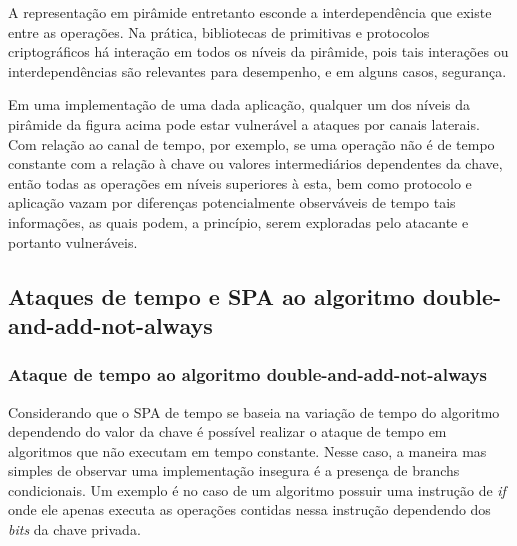 A representação em pirâmide entretanto esconde a interdependência que existe entre as operações. Na prática, bibliotecas de primitivas e protocolos criptográficos há interação em todos os níveis da pirâmide, pois tais interações ou interdependências são relevantes para desempenho, e em alguns casos, segurança. 

Em uma implementação de uma dada aplicação, qualquer um dos níveis da pirâmide da figura acima pode estar vulnerável a ataques por canais laterais. Com relação ao canal de tempo, por exemplo, se uma operação não é de tempo constante com a relação à chave ou valores intermediários dependentes da chave, então todas as operações em níveis superiores à esta, bem como protocolo e aplicação vazam por diferenças potencialmente observáveis de tempo tais informações, as quais podem, a princípio, serem exploradas pelo atacante e portanto vulneráveis.



\subsection{Ataques de tempo e SPA ao algoritmo double-and-add-not-always}

\subsubsection{Ataque de tempo ao algoritmo double-and-add-not-always}
Considerando que o SPA de tempo se baseia na variação de tempo do algoritmo dependendo do valor da chave é possível realizar o ataque de tempo em algoritmos que não executam em tempo constante. Nesse caso, a maneira mas simples de observar uma implementação insegura é a presença de branchs condicionais. Um exemplo é no caso de um algoritmo possuir uma instrução de \textit{if} onde ele apenas executa as operações contidas nessa instrução dependendo dos \textit{bits} da chave privada.

